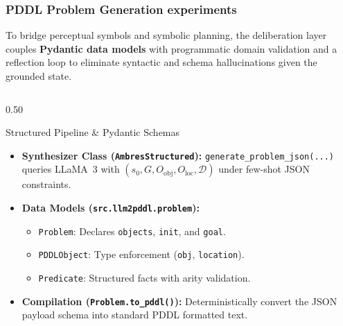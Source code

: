 \documentclass[10pt]{beamer}
\begin{document}
\begin{frame}[t]
    \frametitle{PDDL Problem Generation experiments}
    \footnotesize
    To bridge perceptual symbols and symbolic planning, the deliberation layer couples \textbf{Pydantic data models} with programmatic domain validation and a reflection loop to eliminate syntactic and schema hallucinations given the grounded state.

    \vspace{0.04cm}
    \begin{columns}[T]
        \begin{column}{0.50\textwidth}
            \begin{block}{Structured Pipeline \& Pydantic Schemas}
                \begin{itemize}\scriptsize
                    \setlength\itemsep{0.10em}
                    \item \textbf{Synthesizer Class (\texttt{AmbresStructured}):}
                    \newline \texttt{generate\_problem\_json(...)} queries LLaMA~3 with $(s_0, G, O_{\text{obj}}, O_{\text{loc}}, \mathcal{D})$ under few-shot JSON constraints.
                    \item \textbf{Data Models (\texttt{src.llm2pddl.problem}):}
                    \begin{itemize}\scriptsize
                        \setlength\itemsep{0.02em}
                        \item \texttt{Problem}: Declares \texttt{objects}, \texttt{init}, and \texttt{goal}.
                        \item \texttt{PDDLObject}: Type enforcement (\texttt{obj}, \texttt{location}).
                        \item \texttt{Predicate}: Structured facts with arity validation.
                    \end{itemize}
                    \item \textbf{Compilation (\texttt{Problem.to\_pddl()}):}
                    \newline Deterministically convert the JSON payload schema into standard PDDL formatted text.
                \end{itemize}
            \end{block}
        \end{column}


\end{columns}
\end{frame}
\end{document}
